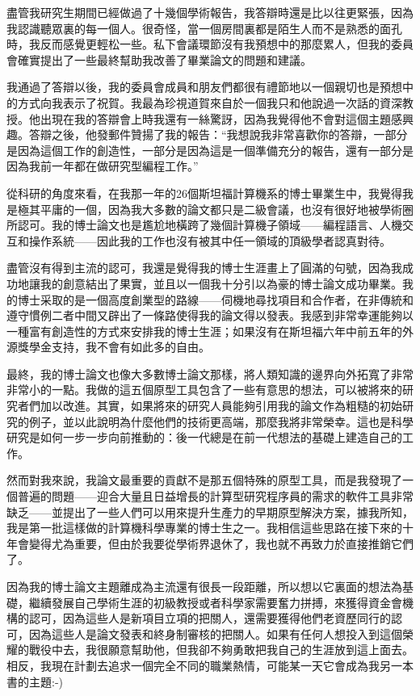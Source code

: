 \documentclass[12pt,UTF8,nofonts]{book}
\begin{document}
盡管我研究生期間已經做過了十幾個學術報告，我答辯時還是比以往更緊張，因為我認識聽眾裏的每一個人。很奇怪，當一個房間裏都是陌生人而不是熟悉的面孔時，我反而感覺更輕松一些。私下會議環節沒有我預想中的那麼累人，但我的委員會確實提出了一些最終幫助我改善了畢業論文的問題和建議。

我通過了答辯以後，我的委員會成員和朋友們都很有禮節地以一個親切也是預想中的方式向我表示了祝賀。我最為珍視道賀來自於一個我只和他說過一次話的資深教授。他出現在我的答辯會上時我還有一絲驚訝，因為我覺得他不會對這個主題感興趣。答辯之後，他發郵件贊揚了我的報告：“我想說我非常喜歡你的答辯，一部分是因為這個工作的創造性，一部分是因為這是一個準備充分的報告，還有一部分是因為我前一年都在做研究型編程工作。”

\breakline

從科研的角度來看，在我那一年的26個斯坦福計算機系的博士畢業生中，我覺得我是極其平庸的一個，因為我大多數的論文都只是二級會議，也沒有很好地被學術圈所認可。我的博士論文也是尷尬地橫跨了幾個計算機子領域——編程語言、人機交互和操作系統——因此我的工作也沒有被其中任一領域的頂級學者認真對待。

盡管沒有得到主流的認可，我還是覺得我的博士生涯畫上了圓滿的句號，因為我成功地讓我的創意結出了果實，並且以一個我十分引以為豪的博士論文成功畢業。我的博士采取的是一個高度創業型的路線——伺機地尋找項目和合作者，在非傳統和遵守慣例二者中間又辟出了一條路使得我的論文得以發表。我感到非常幸運能夠以一種富有創造性的方式來安排我的博士生涯；如果沒有在斯坦福六年中前五年的外源獎學金支持，我不會有如此多的自由。

最終，我的博士論文也像大多數博士論文那樣，將人類知識的邊界向外拓寬了非常非常小的一點。我做的這五個原型工具包含了一些有意思的想法，可以被將來的研究者們加以改進。其實，如果將來的研究人員能夠引用我的論文作為粗糙的初始研究的例子，並以此說明為什麼他們的技術更高端，那麼我將非常榮幸。這也是科學研究是如何一步一步向前推動的：後一代總是在前一代想法的基礎上建造自己的工作。

然而對我來說，我論文最重要的貢獻不是那五個特殊的原型工具，而是我發現了一個普遍的問題——迎合大量且日益增長的計算型研究程序員的需求的軟件工具非常缺乏——並提出了一些人們可以用來提升生產力的早期原型解決方案，據我所知，我是第一批這樣做的計算機科學專業的博士生之一。我相信這些思路在接下來的十年會變得尤為重要，但由於我要從學術界退休了，我也就不再致力於直接推銷它們了。

因為我的博士論文主題離成為主流還有很長一段距離，所以想以它裏面的想法為基礎，繼續發展自己學術生涯的初級教授或者科學家需要奮力拼搏，來獲得資金會機構的認可，因為這些人是新項目立項的把關人，還需要獲得他們老資歷同行的認可，因為這些人是論文發表和終身制審核的把關人。如果有任何人想投入到這個榮耀的戰役中去，我很願意幫助他，但我卻不夠勇敢把我自己的生涯放到這上面去。相反，我現在計劃去追求一個完全不同的職業熱情，可能某一天它會成為我另一本書的主題:-)
\end{document}

